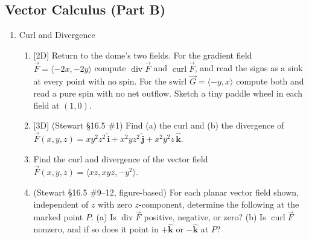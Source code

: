 \documentclass[12pt]{article}
\newcommand{\ihat}{\hat{\textbf{i}}}
\newcommand{\jhat}{\hat{\textbf{j}}}
\newcommand{\khat}{\hat{\textbf{k}}}
\newcommand{\dimtag}[1]{{\footnotesize\textsc{[#1]}}\;}
\newcounter{topic}
\begin{document}
\subsection*{Vector Calculus (Part B)}
\begin{enumerate}\setcounter{enumi}{\value{topic}}

\item Curl and Divergence
    \begin{enumerate}
        \item \dimtag{2D} Return to the dome's two fields. For the gradient field $\vec F = \langle -2x, -2y\rangle$ compute $\operatorname{div}\vec F$ and $\operatorname{curl}\vec F$, and read the signs as a sink at every point with no spin. For the swirl $\vec G = \langle -y, x\rangle$ compute both and read a pure spin with no net outflow. Sketch a tiny paddle wheel in each field at $(1,0)$.
        \item \dimtag{3D} (Stewart \S16.5 \#1) Find (a) the curl and (b) the divergence of $\vec F(x,y,z) = xy^2 z^2\,\ihat + x^2 y z^2\,\jhat + x^2 y^2 z\,\khat$.
        \item Find the curl and divergence of the vector field $\vec{F}(x,y,z) = \langle xz, xyz, -y^2 \rangle$.
        \item (Stewart \S16.5 \#9--12, figure-based) For each planar vector field shown, independent of $z$ with zero $z$-component, determine the following at the marked point $P$. (a) Is $\operatorname{div}\vec F$ positive, negative, or zero? (b) Is $\operatorname{curl}\vec F$ nonzero, and if so does it point in $+\khat$ or $-\khat$ at $P$?
        \begin{center}
        \quad
\end{center}
\end{enumerate}
\end{enumerate}
\end{document}

